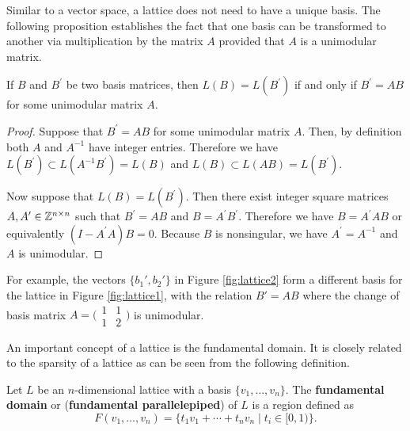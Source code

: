 \documentclass[../main.tex]{subfiles}
\begin{document}
Similar to a vector space, a lattice does not need to have a unique basis. The following proposition establishes the fact that one basis can be transformed to another via multiplication by the matrix $A$ provided that $A$ is a unimodular matrix.
\begin{proposition}
If $B$ and $B^{\prime}$ be two basis matrices, then $L(B) = L(B^{\prime})$ if and only if $B^{\prime} = AB$ for some unimodular matrix $A$.
\end{proposition}
\begin{proof}
Suppose that $B^{\prime} = AB$ for some unimodular matrix $A$. Then, by definition both $A$ and $A^{-1}$ have integer entries.  Therefore we have $L(B^{\prime}) \subset L(A^{-1}B^{\prime}) = L(B)$ and $L(B) \subset L(AB) = L(B^{\prime})$.

Now suppose that $L(B) = L(B^{\prime})$. Then there exist integer square matrices $A, A^{\prime} \in \mathbb{Z}^{n \times n}$ such that $B^{\prime} = AB$ and $B = A^{\prime}B^{\prime}$. Therefore we have $B = A^{\prime}AB$ or equivalently $(I - A^{\prime}A)B = 0$. Because $B$ is nonsingular, we have $A^{\prime} = A^{-1}$ and $A$ is unimodular.
\end{proof}

For example, the vectors $\{b_1',b_2'\}$ in Figure \ref{fig:lattice2} form a different basis for the lattice in Figure \ref{fig:lattice1}, with the relation $B'=AB$ where the change of basis matrix 
$A=\big(\begin{smallmatrix}
  1 & 1\\
  1 & 2
\end{smallmatrix}\big)$
is unimodular.  


An important concept of a lattice is the fundamental domain. It is closely related to the sparsity of a lattice as can be seen from the following definition. 


\begin{definition}
\reversemarginpar
{}
Let $L$ be an $n$-dimensional lattice with a basis $\{v_1, \dots, v_n\}$. The \textbf{fundamental domain}  or (\textbf{fundamental parallelepiped}) of $L$ is a region defined as 
\begin{equation*}
    F(v_1, \dots, v_n) = \{t_1 v_1 + \cdots + t_n v_n \mid t_i \in [0, 1)\}.
\end{equation*}
\end{definition}
\end{document}
